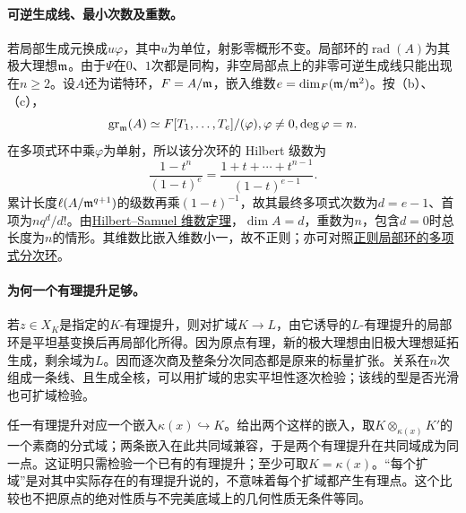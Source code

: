 \paragraph{可逆生成线、最小次数及重数。}
若局部生成元换成$u\varphi$，其中$u$为单位，射影零概形不变。局部环的$\operatorname{rad}(A)$为其极大理想$\mathfrak m$。由于$\Psi$在$0$、$1$次都是同构，非空局部点上的非零可逆生成线只能出现在$n\ge2$。设$A$还为诺特环，$F=A/\mathfrak m$，嵌入维数$e=\dim_F(\mathfrak m/\mathfrak m^2)$。按（b）、（c），
\[
\operatorname{gr}_{\mathfrak m}(A)\simeq F[T_1,\ldots,T_e]/(\varphi),
 \varphi\ne0, \deg\varphi=n.
\]
在多项式环中乘$\varphi$为单射，所以该分次环的 Hilbert 级数为
\[
\frac{1-t^n}{(1-t)^e}
=\frac{1+t+\cdots+t^{n-1}}{(1-t)^{e-1}}.
\]
累计长度$\ell(A/\mathfrak m^{q+1})$的级数再乘$(1-t)^{-1}$，故其最终多项式次数为$d=e-1$、首项为$nq^d/d!$。由\href{https://stacks.math.columbia.edu/tag/00KQ}{Hilbert--Samuel 维数定理}，$\dim A=d$，重数为$n$，包含$d=0$时总长度为$n$的情形。其维数比嵌入维数小一，故不正则；亦可对照\href{https://stacks.math.columbia.edu/tag/00NO}{正则局部环的多项式分次环}。

\paragraph{为何一个有理提升足够。}
若$z\in X_K$是指定的$K$-有理提升，则对扩域$K\to L$，由它诱导的$L$-有理提升的局部环是平坦基变换后再局部化所得。因为原点有理，新的极大理想由旧极大理想延拓生成，剩余域为$L$。因而逐次商及整条分次同态都是原来的标量扩张。关系在$n$次组成一条线、且生成全核，可以用扩域的忠实平坦性逐次检验；该线的型是否光滑也可扩域检验。

任一有理提升对应一个嵌入$\kappa(x)\hookrightarrow K$。给出两个这样的嵌入，取$K\otimes_{\kappa(x)}K'$的一个素商的分式域；两条嵌入在此共同域兼容，于是两个有理提升在共同域成为同一点。这证明只需检验一个已有的有理提升；至少可取$K=\kappa(x)$。“每个扩域”是对其中实际存在的有理提升说的，不意味着每个扩域都产生有理点。这个比较也不把原点的绝对性质与不完美底域上的几何性质无条件等同。
\endgroup
